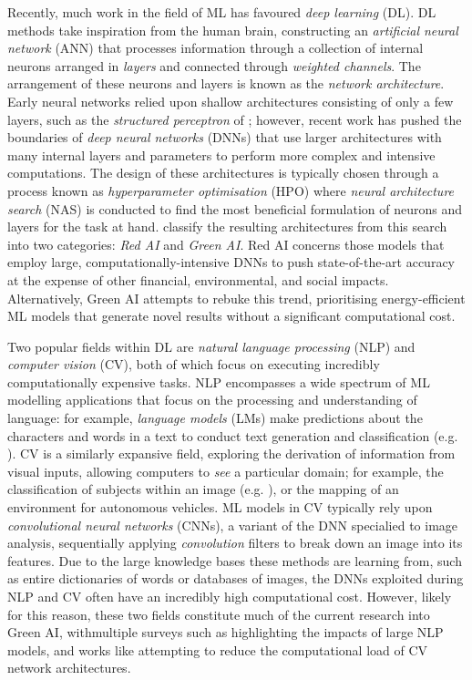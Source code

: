 \documentclass[a4paper, 12pt]{article}
\begin{document}
    Recently, much work in the field of ML has favoured \emph{deep learning} (DL). DL methods take inspiration from the human brain, constructing an \emph{artificial neural network} (ANN) that processes information through a collection of internal neurons arranged in \emph{layers} and connected through \emph{weighted channels}. The arrangement of these neurons and layers is known as the \emph{network architecture}. Early neural networks relied upon shallow architectures consisting of only a few layers, such as the \emph{structured perceptron} of ; however, recent work has pushed the boundaries of \emph{deep neural networks} (DNNs) that use larger architectures with many internal layers and parameters to perform more complex and intensive computations. The design of these architectures is typically chosen through a process known as \emph{hyperparameter optimisation} (HPO) where \emph{neural architecture search} (NAS) is conducted to find the most beneficial formulation of neurons and layers for the task at hand.  classify the resulting architectures from this search into two categories: \emph{Red AI} and \emph{Green AI}. Red AI concerns those models that employ large, computationally-intensive DNNs to push state-of-the-art accuracy at the expense of other financial, environmental, and social impacts. Alternatively, Green AI attempts to rebuke this trend, prioritising energy-efficient ML models that generate novel results without a significant computational cost. 

    Two popular fields within DL are \emph{natural language processing} (NLP) and \emph{computer vision} (CV), both of which focus on executing incredibly computationally expensive tasks. NLP encompasses a wide spectrum of ML modelling applications that focus on the processing and understanding of language: for example, \emph{language models} (LMs) make predictions about the characters and words in a text to conduct text generation and classification (e.g. ). CV is a similarly expansive field, exploring the derivation of information from visual inputs, allowing computers to \emph{see} a particular domain; for example, the classification of subjects within an image (e.g. ), or the mapping of an environment for autonomous vehicles. ML models in CV typically rely upon \emph{convolutional neural networks} (CNNs), a variant of the DNN specialied to image analysis, sequentially applying \emph{convolution} filters to break down an image into its features. Due to the large knowledge bases these methods are learning from, such as entire dictionaries of words or databases of images, the DNNs exploited during NLP and CV often have an incredibly high computational cost. However, likely for this reason, these two fields constitute much of the current research into Green AI, withmultiple surveys such as  highlighting the impacts of large NLP models, and works like  attempting to reduce the computational load of CV network architectures. 
    
\end{document}
